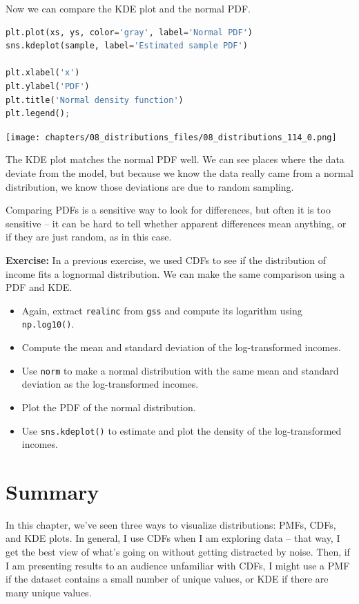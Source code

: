 Now we can compare the KDE plot and the normal PDF.

\begin{lstlisting}[language=Python,style=source]
plt.plot(xs, ys, color='gray', label='Normal PDF')
sns.kdeplot(sample, label='Estimated sample PDF')

plt.xlabel('x')
plt.ylabel('PDF')
plt.title('Normal density function')
plt.legend();
\end{lstlisting}

\begin{center}
\texttt{[image: chapters/08\_distributions\_files/08\_distributions\_114\_0.png]}
\end{center}

The KDE plot matches the normal PDF well. We can see places where the
data deviate from the model, but because we know the data really came
from a normal distribution, we know those deviations are due to random
sampling.

Comparing PDFs is a sensitive way to look for differences, but often it
is too sensitive -- it can be hard to tell whether apparent differences
mean anything, or if they are just random, as in this case.

\textbf{Exercise:} In a previous exercise, we used CDFs to see if the
distribution of income fits a lognormal distribution. We can make the
same comparison using a PDF and KDE.

\begin{itemize}
\item
  Again, extract \passthrough{\lstinline!realinc!} from
  \passthrough{\lstinline!gss!} and compute its logarithm using
  \passthrough{\lstinline!np.log10()!}.
\item
  Compute the mean and standard deviation of the log-transformed
  incomes.
\item
  Use \passthrough{\lstinline!norm!} to make a normal distribution with
  the same mean and standard deviation as the log-transformed incomes.
\item
  Plot the PDF of the normal distribution.
\item
  Use \passthrough{\lstinline!sns.kdeplot()!} to estimate and plot the
  density of the log-transformed incomes.
\end{itemize}

\section{Summary}\label{summary}

In this chapter, we've seen three ways to visualize distributions: PMFs,
CDFs, and KDE plots. In general, I use CDFs when I am exploring data --
that way, I get the best view of what's going on without getting
distracted by noise. Then, if I am presenting results to an audience
unfamiliar with CDFs, I might use a PMF if the dataset contains a small
number of unique values, or KDE if there are many unique values.

